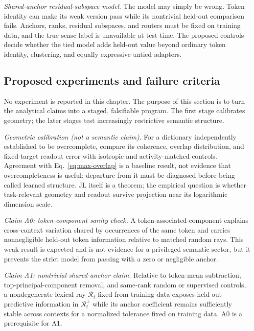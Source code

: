 \documentclass[
  aps,
  reprint,
  superscriptaddress,
  floatfix,
  nofootinbib,
  longbibliography
]{revtex4-2}
\begin{document}
\emph{Shared-anchor residual-subspace model.}  The model may simply be wrong.  Token identity
can make its weak version pass while its nontrivial held-out comparison fails.
Anchors, ranks, residual subspaces, and routers must be fixed on training data, and the true
sense label is unavailable at test time.  The proposed controls decide whether
the tied model adds held-out value beyond ordinary token identity, clustering,
and equally expressive untied adapters.

\subsection{Proposed experiments and failure criteria}
\label{sec:predictions}

No experiment is reported in this chapter.  The purpose of this section is to
turn the analytical claims into a staged, falsifiable program.  The first
stage calibrates geometry; the later stages test increasingly restrictive
semantic structure.

\emph{Geometric calibration (not a semantic claim).}
For a dictionary independently established to be overcomplete, compare its
coherence, overlap distribution, and fixed-target readout error with isotropic
and activity-matched controls.  Agreement with Eq.~\eqref{eq:max-overlap} is a
baseline result, not evidence that overcompleteness is useful; departure from
it must be diagnosed before being called learned structure.  JL itself is a
theorem; the empirical question is whether task-relevant geometry and readout
survive projection near its logarithmic dimension scale.

\emph{Claim A0: token-component sanity check.}
A token-associated component explains cross-context variation shared by
occurrences of the same token and carries nonnegligible held-out token
information relative to matched random rays.  This weak result is expected and
is not evidence for a privileged semantic sector, but it prevents the strict
model from passing with a zero or negligible anchor.

\emph{Claim A1: nontrivial shared-anchor claim.}
Relative to token-mean subtraction, top-principal-component removal, and
same-rank random or supervised controls, a nondegenerate lexical ray
$\mathcal R_t$ fixed from training data exposes held-out predictive information
in $\mathcal R_t^\perp$ while its anchor coefficient remains sufficiently
stable across contexts for a normalized tolerance fixed on training data.  A0
is a prerequisite for A1.
\end{document}
